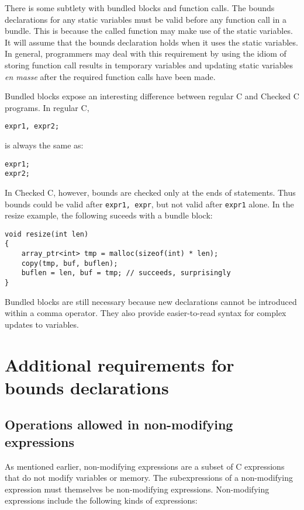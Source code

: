 There is some subtlety with bundled blocks and function calls. The
bounds declarations for any static variables must be valid before any
function call in a bundle. This is because the called function may make
use of the static variables. It will assume that the bounds declaration
holds when it uses the static variables. In general, programmers may
deal with this requirement by using the idiom of storing function call
results in temporary variables and updating static variables \textit{en
masse} after the required function calls have been made.

Bundled blocks expose an interesting difference between regular C
and Checked C programs.  In regular C, 
\begin{verbatim}
expr1, expr2;
\end{verbatim}

is always the same as:

\begin{verbatim}
expr1;
expr2;
\end{verbatim}

In Checked C, however, bounds are checked only at the ends of
statements.  Thus bounds could be valid after
\verb+expr1, expr+, but not valid after \verb+expr1+ alone.
In the resize example, the following suceeds with a bundle
block:
\begin{verbatim}
void resize(int len) 
{
    array_ptr<int> tmp = malloc(sizeof(int) * len);
    copy(tmp, buf, buflen);
    buflen = len, buf = tmp; // succeeds, surprisingly
}
\end{verbatim}
Bundled blocks are still necessary because new declarations
cannot be introduced within a comma operator.  They also provide
easier-to-read syntax for complex updates to variables.

\section{Additional requirements for bounds declarations}

\subsection{Operations allowed in non-modifying expressions}
\label{section:non-modifying-expressions}

As mentioned earlier, non-modifying expressions are a subset of C
expressions that do not modify variables or memory. The subexpressions
of a non-modifying expression must themselves be non-modifying
expressions. Non-modifying expressions include the following kinds of
expressions:

